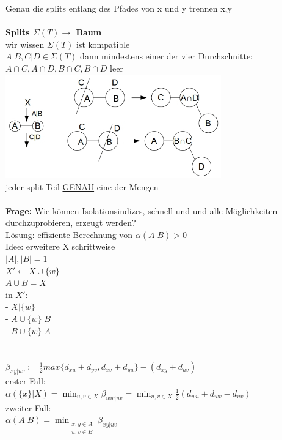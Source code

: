 Genau die splits entlang des Pfades von x und y trennen x,y
\\\\
\textbf{Splits $\Sigma(T) \rightarrow$ Baum}\\
wir wissen $\Sigma(T)$ ist kompatible\\
$A|B,C|D \in \Sigma(T)$ dann mindestens einer der vier Durchschnitte:\\ $A \cap C, A \cap D, B \cap C, B \cap D$ leer\\
\includegraphics[width=0.7\textwidth]{lectures/161216/pix/3.jpg}\\
jeder split-Teil \underline{GENAU} eine der Mengen\\\\
\textbf{Frage:} Wie können Isolationsindizes, schnell und und alle Möglichkeiten durchzuprobieren, erzeugt werden?\\
Lösung: effiziente Berechnung von $\alpha(A|B)>0$\\
Idee: erweitere X schrittweise\\
$|A|,|B|=1$\\
$X' \leftarrow X \cup \{w\}$\\
$A\cup B=X$\\
in $X':$\\
- \hspace{10pt}$X|\{w\}$\\
- \hspace{10pt}$A\cup \{w\}|B$\\
- \hspace{10pt}$B\cup \{w\}|A$\\
\\\\
$\beta_{xy|uv}:=\frac{1}{2}max\{d_{xu} + d_{yv}, d_{xv} + d_{yu}\} - (d_{xy} + d_{uv})$\\
erster Fall:\\
$\alpha(\{x\}|X)=\displaystyle\min_{u,v \in X}\beta_{ww|uv}=\displaystyle\min_{u,v \in X} \frac{1}{2}(d_{wu} + d_{wv} - d_{uv})$\\
zweiter Fall:\\
$\alpha(A|B)=\displaystyle\min_{\substack{x,y \in A \\ u,v \in B}}\beta_{xy|uv}$\\

